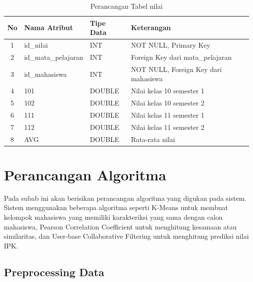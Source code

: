 \begin{enumerate}
        \begin{table}[H]
            \centering
            \begin{tabular}{|c|p{4cm}|p{4cm}|p{4cm}|}
                \hline
                No & Nama Atribut & Tipe Data & Keterangan \\
                \hline
                1 & id\_nilai & INT & NOT NULL, Primary Key \\
                \hline
                2 & id\_mata\_pelajaran & INT & Foreign Key dari mata\_pelajaran \\
                \hline
                3 & id\_mahasiswa & INT & NOT NULL, Foreign Key dari mahasiswa \\
                \hline
                4 & 101 & DOUBLE & Nilai kelas 10 semester 1 \\
                \hline
                5 & 102 & DOUBLE & Nilai kelas 10 semester 2 \\
                \hline
                6 & 111 & DOUBLE & Nilai kelas 11 semester 1 \\
                \hline
                7 & 112 & DOUBLE & Nilai kelas 11 semester 2 \\
                \hline
                8 & AVG & DOUBLE & Rata-rata nilai \\
                \hline
            \end{tabular}
            \caption{Perancangan Tabel nilai}
            \label{tab:perancangan tabel nilai}
        \end{table}
\end{enumerate}

\section{Perancangan Algoritma}
\label{sec:perancangan algoritma}

Pada subab ini akan berisikan perancangan algoritma yang digukan pada sistem. Sistem menggunakan beberapa algoritma seperti K-Means untuk membuat kelompok mahasiswa yang memiliki karakteriksi yang sama dengan calon mahasiswa, Pearson Correlation Coefficient untuk menghitung kesamaan atau similaritas, dan User-base Collaborative Filtering untuk menghitung prediksi nilai IPK.

\subsection{Preprocessing Data}
\label{subsec:perancangan preprocessing data}

